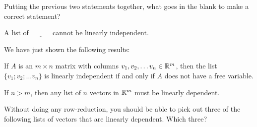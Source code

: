 \endedxproblem



Putting the previous two statements together, what goes in the blank to make a correct statement?  

A list of  $\underline{\;\;\;\;\;\;\;\;\;\;}$ cannot be linearly independent.


\endedxproblem




\endedxvertical





We have just shown the following results:  

If $A$ is an $m\times n$ matrix with columns 
$v_1, v_2, \ldots v_n \in \mathbb R^m$, then the list $\{v_1; v_2; \ldots v_n\}$ is linearly independent
if and only if $A$ does not have a free variable.  

If $n>m$, then any list of $n$ vectors in $\mathbb R^m$ must be linearly dependent.  


\endedxtext






Without doing any row-reduction, you should be able to pick out three of the 
following lists of vectors that are linearly dependent.  Which three?  

